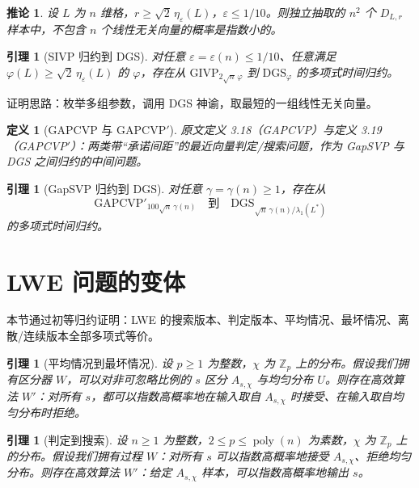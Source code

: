 \documentclass[11pt,a4paper]{article}
\newtheorem{lemma}[theorem]{引理}
\newtheorem{corollary}[theorem]{推论}
\newtheorem{definition}[theorem]{定义}
\DeclareMathOperator{\poly}{poly}
\newcommand{\Z}{\mathbb{Z}}
\begin{document}
\begin{corollary}
设 $L$ 为 $n$ 维格，$r\ge\sqrt{2}\,\eta_{\varepsilon}(L)$，$\varepsilon\le 1/10$。则独立抽取的 $n^{2}$ 个 $D_{L,r}$ 样本中，不包含 $n$ 个线性无关向量的概率是指数小的。
\end{corollary}

\begin{lemma}[SIVP 归约到 DGS]
对任意 $\varepsilon=\varepsilon(n)\le 1/10$、任意满足 $\varphi(L)\ge\sqrt{2}\,\eta_{\varepsilon}(L)$ 的 $\varphi$，存在从 $\mathrm{GIVP}_{2\sqrt{n}\,\varphi}$ 到 $\mathrm{DGS}_{\varphi}$ 的多项式时间归约。
\end{lemma}

证明思路：枚举多组参数，调用 DGS 神谕，取最短的一组线性无关向量。

\begin{definition}[GAPCVP 与 GAPCVP$'$]
原文定义 3.18（GAPCVP）与定义 3.19（GAPCVP$'$）：两类带``承诺间距''的最近向量判定/搜索问题，作为 GapSVP 与 DGS 之间归约的中间问题。
\end{definition}

\setcounter{theorem}{19} %
\begin{lemma}[GapSVP 归约到 DGS]
对任意 $\gamma=\gamma(n)\ge 1$，存在从
\[
  \mathrm{GAPCVP}'_{100\sqrt{n}\,\gamma(n)}
  \quad\text{到}\quad
  \mathrm{DGS}_{\sqrt{n}\,\gamma(n)/\lambda_{1}(L^{*})}
\]
的多项式时间归约。
\end{lemma}

\section{LWE 问题的变体}

本节通过初等归约证明：LWE 的搜索版本、判定版本、平均情况、最坏情况、离散/连续版本全部多项式等价。

\begin{lemma}[平均情况到最坏情况]
设 $p\ge 1$ 为整数，$\chi$ 为 $\Z_{p}$ 上的分布。假设我们拥有区分器 $W$，可以对非可忽略比例的 $s$ 区分 $A_{s,\chi}$ 与均匀分布 $U$。则存在高效算法 $W'$：对所有 $s$，都可以指数高概率地在输入取自 $A_{s,\chi}$ 时接受、在输入取自均匀分布时拒绝。
\end{lemma}

\begin{lemma}[判定到搜索]
设 $n\ge 1$ 为整数，$2\le p\le\poly(n)$ 为素数，$\chi$ 为 $\Z_{p}$ 上的分布。假设我们拥有过程 $W$：对所有 $s$ 可以指数高概率地接受 $A_{s,\chi}$、拒绝均匀分布。则存在高效算法 $W'$：给定 $A_{s,\chi}$ 样本，可以指数高概率地输出 $s$。
\end{lemma}
\end{document}
